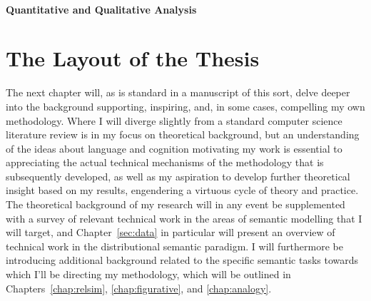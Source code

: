 \paragraph{Quantitative and Qualitative Analysis} 

\section{The Layout of the Thesis}
The next chapter will, as is standard in a manuscript of this sort, delve deeper into the background supporting, inspiring, and, in some cases, compelling my own methodology.  Where I will diverge slightly from a standard computer science literature review is in my focus on theoretical background, but an understanding of the ideas about language and cognition motivating my work is essential to appreciating the actual technical mechanisms of the methodology that is subsequently developed, as well as my aspiration to develop further theoretical insight based on my results, engendering a virtuous cycle of theory and practice.  The theoretical background of my research will in any event be supplemented with a survey of relevant technical work in the areas of semantic modelling that I will target, and Chapter~\ref{sec:data} in particular will present an overview of technical work in the distributional semantic paradigm.  I will furthermore be introducing additional background related to the specific semantic tasks towards which I'll be directing my methodology, which will be outlined in Chapters~\ref{chap:relsim}, \ref{chap:figurative}, and \ref{chap:analogy}.

